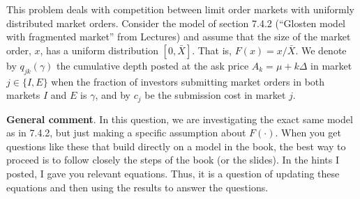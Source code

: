 \documentclass[11pt
, answers
]{exam}
\begin{document}
This problem deals with competition between limit order markets with uniformly distributed market orders. Consider the model of section 7.4.2 (``Glosten model with fragmented market'' from Lectures) and assume that the size of the market order, $x$, has a uniform distribution $[0,\bar{X}]$. That is, $F(x)=x/{\bar{X}}$. We denote by $q_{jk}(\gamma)$ the cumulative depth posted at the ask price $A_{k}=\mu+k\Delta$ in market $j \in \{I,E\}$ when the fraction of investors submitting market orders in both markets $I$ and $E$ is $\gamma$, and by $c_{j}$ be the submission cost in market $j$.

\begin{solution}
	\noindent \textbf{General comment}. In this question, we are investigating the exact same model as in 7.4.2, but just making a specific assumption about $F(\cdot)$. When you get questions like these that build directly on a model in the book, the best way to proceed is to follow closely the steps of the book (or the slides). In the hints I posted, I gave you relevant equations. Thus, it is a question of updating these equations and then using the results to answer the questions.
\end{solution}
\end{document}
